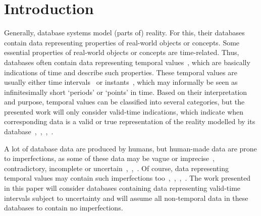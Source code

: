 \documentclass[runningheads,a4paper]{llncs}
\begin{document}
\section{Introduction}
Generally, database systems model (parts of) reality. For this, their databases contain data representing properties of real-world objects or concepts. Some essential properties of real-world objects or concepts are time-related. Thus, databases often contain data representing temporal values~\cite{Bohlen1998lncs}, which are basically indications of time and describe such properties. These temporal values are usually either time intervals~\cite{Bohlen1998lncs} or instants~\cite{Bohlen1998lncs}, which may informally be seen as infinitesimally short `periods' or `points' in time. Based on their interpretation and purpose, temporal values can be classified into several categories, but the presented work will only consider valid-time indications, which indicate when corresponding data is a valid or true representation of the reality modelled by its database~\cite{Bohlen1998lncs},~\cite{Pons2012ijcis},~\cite{Billiet2012ipmu},~\cite{Pons2012ipmu}.

A lot of database data are produced by humans, but human-made data are prone to imperfections, as some of these data may be vague or imprecise~\cite{Medina1994is}, contradictory, incomplete or uncertain~\cite{Billiet2012ipmu},~\cite{Pons2012ipmu},~\cite{Bosc2010ijufkbs}. Of course, data representing temporal values may contain such imperfections too~\cite{Pons2012ijcis},~\cite{Billiet2012ipmu},~\cite{Pons2012ipmu},~\cite{Dyreson1998acm}. The work presented in this paper will consider databases containing data representing valid-time intervals subject to uncertainty and will assume all non-temporal data in these databases to contain no imperfections.
\end{document}
